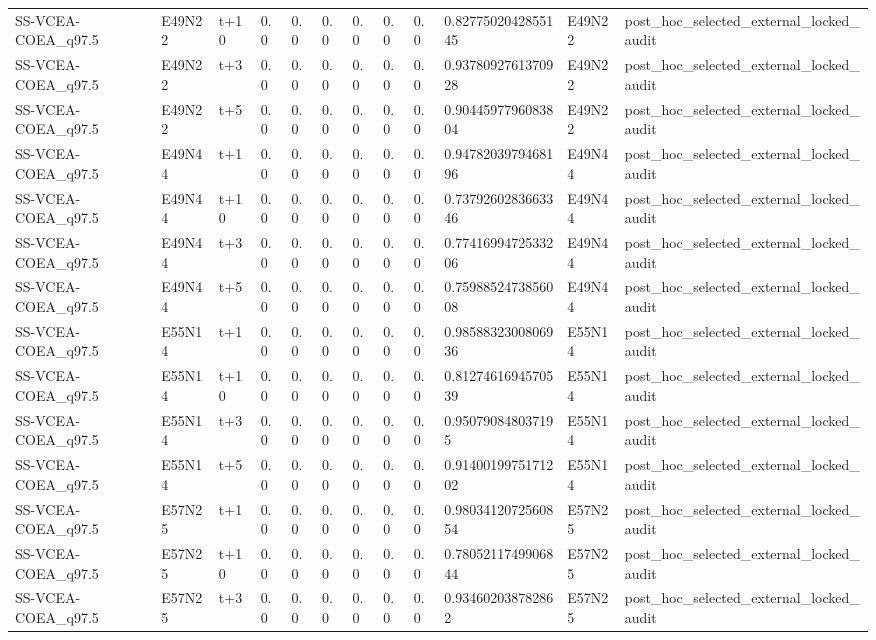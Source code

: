 \begin{landscape}
\begin{longtable}{llllllllllll}
SS-VCEA-COEA\_q97.5 & E49N22 & t+10 & 0.0 & 0.0 & 0.0 & 0.0 & 0.0 & 0.0 & 0.8277502042855145 & E49N22 & post\_hoc\_selected\_external\_locked\_audit \\
SS-VCEA-COEA\_q97.5 & E49N22 & t+3 & 0.0 & 0.0 & 0.0 & 0.0 & 0.0 & 0.0 & 0.9378092761370928 & E49N22 & post\_hoc\_selected\_external\_locked\_audit \\
SS-VCEA-COEA\_q97.5 & E49N22 & t+5 & 0.0 & 0.0 & 0.0 & 0.0 & 0.0 & 0.0 & 0.9044597796083804 & E49N22 & post\_hoc\_selected\_external\_locked\_audit \\
SS-VCEA-COEA\_q97.5 & E49N44 & t+1 & 0.0 & 0.0 & 0.0 & 0.0 & 0.0 & 0.0 & 0.9478203979468196 & E49N44 & post\_hoc\_selected\_external\_locked\_audit \\
SS-VCEA-COEA\_q97.5 & E49N44 & t+10 & 0.0 & 0.0 & 0.0 & 0.0 & 0.0 & 0.0 & 0.7379260283663346 & E49N44 & post\_hoc\_selected\_external\_locked\_audit \\
SS-VCEA-COEA\_q97.5 & E49N44 & t+3 & 0.0 & 0.0 & 0.0 & 0.0 & 0.0 & 0.0 & 0.7741699472533206 & E49N44 & post\_hoc\_selected\_external\_locked\_audit \\
SS-VCEA-COEA\_q97.5 & E49N44 & t+5 & 0.0 & 0.0 & 0.0 & 0.0 & 0.0 & 0.0 & 0.7598852473856008 & E49N44 & post\_hoc\_selected\_external\_locked\_audit \\
SS-VCEA-COEA\_q97.5 & E55N14 & t+1 & 0.0 & 0.0 & 0.0 & 0.0 & 0.0 & 0.0 & 0.9858832300806936 & E55N14 & post\_hoc\_selected\_external\_locked\_audit \\
SS-VCEA-COEA\_q97.5 & E55N14 & t+10 & 0.0 & 0.0 & 0.0 & 0.0 & 0.0 & 0.0 & 0.8127461694570539 & E55N14 & post\_hoc\_selected\_external\_locked\_audit \\
SS-VCEA-COEA\_q97.5 & E55N14 & t+3 & 0.0 & 0.0 & 0.0 & 0.0 & 0.0 & 0.0 & 0.950790848037195 & E55N14 & post\_hoc\_selected\_external\_locked\_audit \\
SS-VCEA-COEA\_q97.5 & E55N14 & t+5 & 0.0 & 0.0 & 0.0 & 0.0 & 0.0 & 0.0 & 0.9140019975171202 & E55N14 & post\_hoc\_selected\_external\_locked\_audit \\
SS-VCEA-COEA\_q97.5 & E57N25 & t+1 & 0.0 & 0.0 & 0.0 & 0.0 & 0.0 & 0.0 & 0.9803412072560854 & E57N25 & post\_hoc\_selected\_external\_locked\_audit \\
SS-VCEA-COEA\_q97.5 & E57N25 & t+10 & 0.0 & 0.0 & 0.0 & 0.0 & 0.0 & 0.0 & 0.7805211749906844 & E57N25 & post\_hoc\_selected\_external\_locked\_audit \\
SS-VCEA-COEA\_q97.5 & E57N25 & t+3 & 0.0 & 0.0 & 0.0 & 0.0 & 0.0 & 0.0 & 0.934602038782862 & E57N25 & post\_hoc\_selected\_external\_locked\_audit \\

\end{longtable}
\end{landscape}
